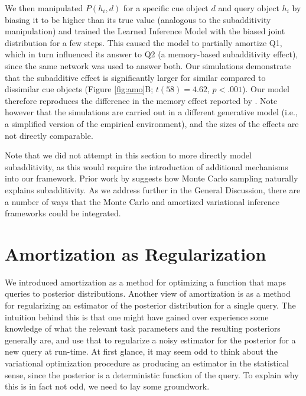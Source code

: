 We then manipulated $P(h_i,d)$ for a specific cue object $d$ and query object $h_i$ by biasing it to be higher than its true value (analogous to the subadditivity manipulation) and trained the Learned Inference Model with the biased joint distribution for a few steps. This caused the model to partially amortize Q1, which in turn influenced its answer to Q2 (a memory-based subadditivity effect), since the same network was used to answer both. Our simulations demonstrate that the subadditive effect is significantly larger for similar compared to dissimilar cue objects (Figure \ref{fig:amo}B; $t(58)=4.62$, $p<.001$). Our model therefore reproduces the difference in the memory effect reported by \citet{dasgupta2018remembrance}. Note however that the simulations are carried out in a different generative model (i.e., a simplified version of the empirical environment), and the sizes of the effects are not directly comparable.

Note that we did not attempt in this section to more directly model subadditivity, as this would require the introduction of additional mechanisms into our framework. Prior work by \citet{dasgupta2017hypotheses} suggests how Monte Carlo sampling naturally explains subadditivity. As we address further in the General Discussion, there are a number of ways that the Monte Carlo and amortized variational inference frameworks could be integrated.

\section{Amortization as Regularization}

We introduced amortization as a method for optimizing a function that maps queries to posterior distributions. Another view of amortization is as a method for regularizing an estimator of the posterior distribution for a single query. The intuition behind this is that one might have gained over experience some knowledge of what the relevant task parameters and the resulting posteriors generally are, and use that to regularize a noisy estimator for the posterior for a new query at run-time. At first glance, it may seem odd to think about the variational optimization procedure as producing an estimator in the statistical sense, since the posterior is a deterministic function of the query. To explain why this is in fact not odd, we need to lay some groundwork.


